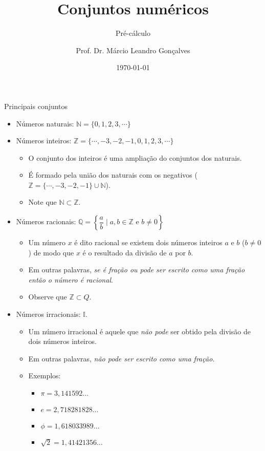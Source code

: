 \documentclass[14pt, aspectratio=169]{beamer}
\title{Conjuntos numéricos}
\subtitle{Pré-cálculo}
\author{Prof. Dr. Márcio Leandro Gonçalves}
\date{\today}
\institute{PUC Minas - Poços de Caldas}
\newcommand{\I}{\mathbb{I}}
\newcommand{\Q}{\mathbb{Q}}
\newcommand{\Z}{\mathbb{Z}}
\newcommand{\N}{\mathbb{N}}
\begin{document}
\begin{frame}
\maketitle 
\end{frame}

\begin{frame}[allowframebreaks]{Principais conjuntos}
\begin{itemize}
    \item Números naturais: $\N = \{ 0,1,2,3, \cdots \}$
    \item Números inteiros: $\Z = \{\cdots, -3, -2, -1, 0, 1, 2, 3, \cdots \}$ 
    \begin{itemize}
        \item O conjunto dos inteiros é uma ampliação do conjuntos dos naturais.
        \item É formado pela união dos naturais com os negativos ($\mathbb{Z} = \{ \cdots, -3, -2, -1\} \cup \N$).
        \item Note que $\N \subset \Z$.
    \end{itemize}

    \vspace{5.0cm}
    
    \item Números racionais: $\Q = \left\{ \dfrac{a}{b} \mid a,b \in \Z \text{ e } b \neq 0 \right\}$
    \begin{itemize}
        \item Um número $x$ é dito racional se existem dois números inteiros $a$ e $b$ ($b \neq 0$) de modo que $x$ é o resultado da divisão de $a$ por $b$.
        \item Em outras palavras, \emph{se é fração ou pode ser escrito como uma fração então o número é racional}.
        \item Observe que $\Z \subset Q$.
    \end{itemize}

    \vspace{5.0cm}

    \item Números irracionais: $\I$.
    \begin{itemize}
        \item Um número irracional é aquele que \emph{não pode} ser obtido pela divisão de dois números inteiros.
        \item Em outras palavras, \emph{não pode ser escrito como uma fração.}
        \item Exemplos:
            \begin{itemize}
                \item $\pi = 3,141592\ldots$
                \item $e = 2,718281828\ldots$
                \item $\phi = 1,618033989\ldots$
                \item $\sqrt{2} = 1,41421356\ldots$
            \end{itemize}
    \end{itemize}


\end{itemize}
\end{frame}
\end{document}
